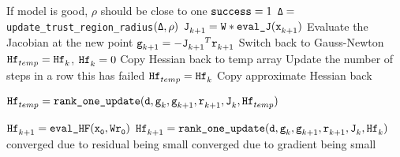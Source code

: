 \begin{algorithm}
\begin{algorithmic}[1]
        \Comment If model is good, $\rho$ should be close to one
          \State ${\tt success} = 1$
        \EndIf
        \State ${\tt \Delta = }${\tt update\_trust\_region\_radius}${\tt (\Delta,\rho)}$
      \EndWhile
      \State $\iter[k+1]{\tJ} = {\tt W * \text{\tt eval\_J}}(\iter[k+1]{\tx})$
      \Comment Evaluate the Jacobian at the new point
      \State $\iter[k+1]{\tg} = -{\iter[k+1]{\tJ}}^T\iter[k+1]{\tr}$
          \If { $\|\iter[k+1]{\tg}\| > \|\iter[k]{\tg} \| $}
          \Comment Switch back to Gauss-Newton
          \State ${\iter[temp]{\thess}} = \iter[k]{\thess}$, $\iter[k]{\thess} = 0$
          \Comment Copy Hessian back to temp array
          \EndIf
        \Else
          \Comment Update the number of steps in a row this has failed
            \State ${\iter[temp]{\thess}} = {\iter[k]{\thess}}$
            \Comment Copy approximate Hessian back
          \EndIf
          \EndIf
        \EndIf
  \end{algorithmic}
  
\end{algorithm}

\begin{algorithm}
  \ContinuedFloat
  \begin{algorithmic}
      \State ${\iter[temp]{\thess}} = \Call{{\tt rank\_one\_update}}{\td ,\iter[k]{\tg},\iter[k+1]{\tg}, \iter[k+1]{\tr},\iter[k]{\tJ},\iter[temp]{\thess}}$
      \EndIf
    \EndIf

        \State $\iter[k+1]{\thess} = {\tt \text{\tt eval\_HF}(\iter[0]{\tx},W\iter[0]{\tr})}$
      \Else
        \State ${\iter[k+1]{\thess}} = \Call{{\tt rank\_one\_update}}{\td ,\iter[k]{\tg},\iter[k+1]{\tg}, \iter[k+1]{\tr},\iter[k]{\tJ},\iter[k]{\thess}}$
      \EndIf
    \EndIf
    \Comment converged due to residual being small
    \Comment converged due to gradient being small
    \EndIf
    \EndFor
  \end{algorithmic}
\end{algorithm}


